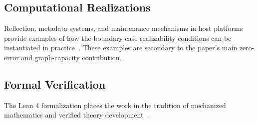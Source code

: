 \subsection{Computational Realizations}\label{sec:related-meta}

Reflection, metadata systems, and maintenance mechanisms in host platforms provide examples of how the boundary-case realizability conditions can be instantiated in practice~\cite{kiczales1991art,smith1984reflection}. These examples are secondary to the paper's main zero-error and graph-capacity contribution.

\subsection{Formal Verification}\label{sec:related-formal}

The Lean 4 formalization places the work in the tradition of mechanized mathematics and verified theory development~\cite{demoura2021lean4,mathlib2020,leroy2009compcert}.

